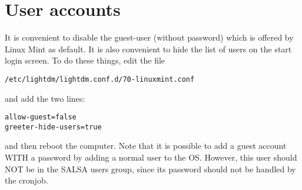 \section{User accounts}
It is convenient to disable the guest-user (without password) which is offered
by Linux Mint as default. It is also convenient to hide the list of
users on the start login screen. To do these things, edit the file
\begin{verbatim}
/etc/lightdm/lightdm.conf.d/70-linuxmint.conf
\end{verbatim}
and add the two lines:
\begin{verbatim}
allow-guest=false
greeter-hide-users=true
\end{verbatim}
and then reboot the computer.
Note that it is possible to add a guest account WITH a password by adding a
normal user to the OS. However, this user should NOT be in the SALSA users
group, since its password should not be handled by the cronjob.
